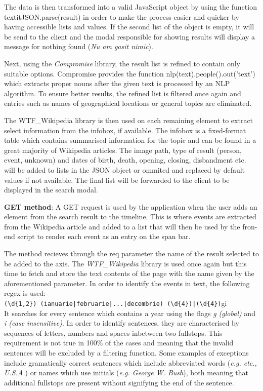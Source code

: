 \documentclass{report}
\begin{document}
The data is then transformed into a valid JavaScript object by using the function textit{JSON.parse(result)} in order to make the process easier and quicker by having accessible lists and values. If the second list of the object is empty, it will be send to the client and the modal responsible for showing results will display a message for nothing found (\textit{Nu am gasit nimic}).\par

Next, using the \textit{Compromise} library, the result list is refined to contain only suitable options. Compromise provides the function nlp(text).people().out('text') which extracts proper nouns after the given text is processed by an NLP algorithm. To ensure better results, the refined list is filtered once again and entries such as names of geographical locations or general topics are eliminated.\par

The WTF\_Wikipedia library is then used on each remaining element to extract select information from the infobox, if available. The infobox is a fixed-format table which contains summarised information for the topic and can be found in a great majority of Wikipedia articles. The image path, type of result (person, event, unknown) and dates of birth, death, opening, closing, disbandment etc. will be added to lists in the JSON object or ommited and replaced by default values if not available. The final list will be forwarded to the client to be displayed in the search modal.\par


\textbf{GET method}: A GET request is used by the application when the user adds an element from the search result to the timeline. This is where events are extracted from the Wikipedia article and added to a list that will then be used by the fron-end script to render each event as an entry on the span bar.\par

The method recieves through the req parameter the name of the result selected to be added to the axis. The \textit{WTF\_Wikipedia} library is used once again but this time to fetch and store the text contents of the page with the name given by the aforementioned parameter. In order to identify the events in text, the following regex is used:\\
\verb/(\d{1,2}) (ianuarie|februarie|...|decembrie) (\d{4})|(\d{4})/gi\\
It searches for every sentence which contains a year using the flags \textit{g (global)} and \textit{i (case insensitive)}. In order to identify sentences, they are characterised by sequences of letters, numbers and spaces inbetween two fullstops. This requirement is not true in 100\% of the cases and meaning that the invalid sentences will be excluded by a filtering function. Some examples of exceptions include gramatically correct sentences which include abbreviated words (\textit{e.g. etc., U.S.A.}) or names which use initials (\textit{e.g. George W. Bush}), both meaning that additional fullstops are present without signifying the end of the sentence. \par
\end{document}
